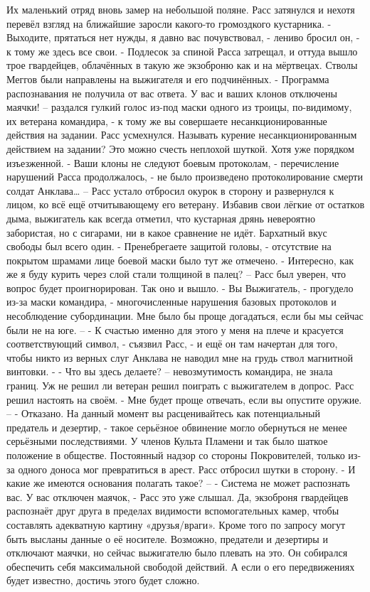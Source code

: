 \documentclass[a4paper, 12pt]{report}
\begin{document}
Их маленький отряд вновь замер на небольшой поляне. Расс затянулся и нехотя перевёл взгляд на ближайшие заросли какого-то громоздкого кустарника.
	- Выходите, прятаться нет нужды, я давно вас почувствовал, - лениво бросил он, - к тому же здесь все свои. - 
	Подлесок за спиной Расса затрещал, и оттуда вышло трое гвардейцев, облачённых в такую же экзоброню как и на мёртвецах. Стволы Меггов были направлены на выжигателя и его подчинённых.
	- Программа распознавания не получила от вас ответа. У вас и ваших клонов отключены маячки! – раздался гулкий голос из-под маски одного из троицы, по-видимому, их ветерана командира, - к тому же вы совершаете несанкционированные действия на задании.
	Расс усмехнулся. Называть курение несанкционированным действием на задании? Это можно счесть неплохой шуткой. Хотя уже порядком изъезженной.
	- Ваши клоны не следуют боевым протоколам, - перечисление нарушений Расса продолжалось, - не было произведено протоколирование смерти солдат Анклава… –
	Расс устало отбросил окурок в сторону и развернулся к лицом, ко всё ещё отчитывающему  его ветерану. Избавив свои лёгкие от остатков дыма, выжигатель как всегда отметил, что кустарная дрянь невероятно забористая, но с сигарами, ни в какое сравнение не идёт. Бархатный вкус свободы был всего один.
	- Пренебрегаете защитой головы, - отсутствие на покрытом шрамами лице боевой маски было тут же отмечено.
	- Интересно, как же я буду курить через слой стали толщиной в палец? – Расс был уверен, что вопрос будет проигнорирован. Так оно и вышло.
	- Вы Выжигатель, - прогудело из-за маски командира, - многочисленные нарушения базовых протоколов и несоблюдение субординации. Мне было бы проще догадаться, если бы мы сейчас были не на юге. –
	- К счастью именно для этого у меня на плече и красуется соответствующий символ, - съязвил Расс, - и ещё он там начертан для того, чтобы никто из верных слуг Анклава не наводил мне на грудь ствол магнитной винтовки. -
	- Что вы здесь делаете? – невозмутимость командира, не знала границ. Уж не решил ли ветеран решил поиграть с выжигателем в допрос. Расс решил настоять на своём.
	- Мне будет проще отвечать, если вы опустите оружие. –
	- Отказано. На данный момент вы расценивайтесь как потенциальный предатель и дезертир, - такое серьёзное обвинение могло обернуться не менее серьёзными последствиями. У членов Культа Пламени и так было шаткое положение в обществе. Постоянный надзор со стороны Покровителей, только из-за одного доноса мог превратиться в арест.
	Расс отбросил шутки в сторону.
	- И какие же имеются основания полагать такое? –
	- Система не может распознать вас. У вас отключен маячок, - Расс это уже слышал. Да, экзоброня гвардейцев распознаёт друг друга в пределах видимости вспомогательных камер, чтобы составлять адекватную картину «друзья/враги». Кроме того по запросу могут быть высланы данные о её носителе. Возможно, предатели и дезертиры и отключают маячки, но сейчас выжигателю было плевать на это. Он собирался обеспечить себя максимальной свободой действий. А если о его передвижениях будет известно, достичь этого будет сложно.
\end{document}
